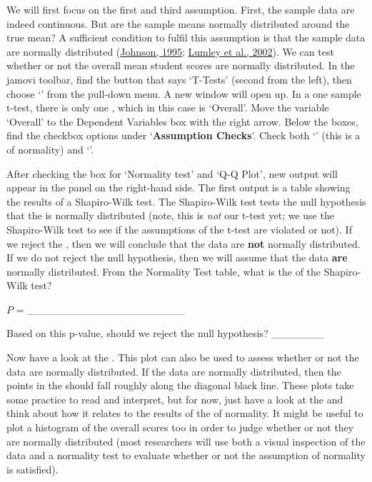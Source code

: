 \documentclass[
  openany]{krantz}
\begin{document}
We will first focus on the first and third assumption.
First, the sample data are indeed continuous.
But are the sample means normally distributed around the true mean?
A sufficient condition to fulfil this assumption is that the sample data are normally distributed (\protect\hyperlink{ref-Johnson1995}{Johnson, 1995}; \protect\hyperlink{ref-Lumley2002}{Lumley et al., 2002}).
We can test whether or not the overall mean student scores are normally distributed.
In the jamovi toolbar, find the button that says `T-Tests' (second from the left), then choose `' from the pull-down menu.
A new window will open up.
In a one sample t-test, there is only one , which in this case is `Overall'.
Move the variable `Overall' to the Dependent Variables box with the right arrow.
Below the boxes, find the checkbox options under `\textbf{Assumption Checks}'.
Check both `' (this is a  of normality) and `'.

After checking the box for `Normality test' and `Q-Q Plot', new output will appear in the panel on the right-hand side.
The first output is a table showing the results of a Shapiro-Wilk test.
The Shapiro-Wilk test tests the null hypothesis that the  is normally distributed (note, this is \emph{not} our t-test yet; we use the Shapiro-Wilk test to see if the assumptions of the t-test are violated or not).
If we reject the , then we will conclude that the data are \textbf{not} normally distributed.
If we do not reject the null hypothesis, then we will assume that the data \textbf{are} normally distributed.
From the Normality Test table, what is the  of the Shapiro-Wilk test?

\(P\) = \_\_\_\_\_\_\_\_\_\_\_\_\_\_\_\_\_\_\_\_\_

Based on this p-value, should we reject the null hypothesis? \_\_\_\_\_\_\_

Now have a look at the .
This plot can also be used to assess whether or not the data are normally distributed.
If the data are normally distributed, then the points in the  should fall roughly along the diagonal black line.
These plots take some practice to read and interpret, but for now, just have a look at the  and think about how it relates to the results of the  of normality.
It might be useful to plot a histogram of the overall scores too in order to judge whether or not they are normally distributed (most researchers will use both a visual inspection of the data and a normality test to evaluate whether or not the assumption of normality is satisfied).
\end{document}

